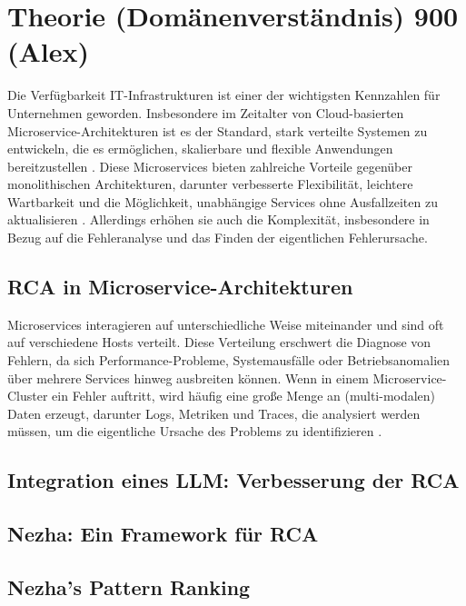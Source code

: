 \chapter{Theorie (Domänenverständnis) 900 (Alex)}
\label{sec:Theorie}

Die Verfügbarkeit IT-Infrastrukturen ist einer der wichtigsten Kennzahlen für Unternehmen geworden. Insbesondere im Zeitalter von Cloud-basierten Microservice-Architekturen ist es der Standard, stark verteilte Systemen zu entwickeln, die es ermöglichen, skalierbare und flexible Anwendungen bereitzustellen . Diese Microservices bieten zahlreiche Vorteile gegenüber monolithischen Architekturen, darunter verbesserte Flexibilität, leichtere Wartbarkeit und die Möglichkeit, unabhängige Services ohne Ausfallzeiten zu aktualisieren . Allerdings erhöhen sie auch die Komplexität, insbesondere in Bezug auf die Fehleranalyse und das Finden der eigentlichen Fehlerursache.

\section{RCA in Microservice-Architekturen}
\label{sec:RCA in Microservice-Architekturen}

Microservices interagieren auf unterschiedliche Weise miteinander und sind oft auf verschiedene Hosts verteilt. Diese Verteilung erschwert die Diagnose von Fehlern, da sich Performance-Probleme, Systemausfälle oder Betriebsanomalien über mehrere Services hinweg ausbreiten können. Wenn in einem Microservice-Cluster ein Fehler auftritt, wird häufig eine große Menge an (multi-modalen) Daten erzeugt, darunter Logs, Metriken und Traces, die analysiert werden müssen, um die eigentliche Ursache des Problems zu identifizieren .


\section{Integration eines LLM: Verbesserung der RCA}
%
%

\section{Nezha: Ein Framework für RCA}


\section{Nezha’s Pattern Ranking}


